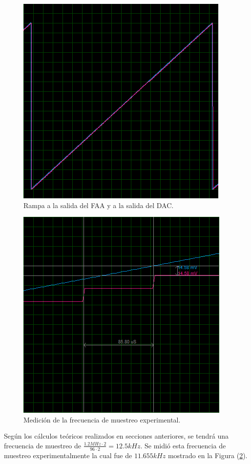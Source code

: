 \begin{figure}[H]
\centering
\includegraphics[width=0.8\linewidth]{ImagenesEjercicio1/rampa1.png}
\caption{Rampa a la salida del FAA y a la salida del DAC.}
\label{med1}
\end{figure}

\begin{figure}[H]
\centering
\includegraphics[width=0.8\linewidth]{ImagenesEjercicio1/rampa1zoom.png}
\caption{Medición de la frecuencia de muestreo experimental.}
\label{med2}
\end{figure}
Según los cálculos teóricos realizados en secciones anteriores, se tendrá una frecuencia de muestreo de $\frac{1.2MHz \cdot 2}{96 \cdot 2} = 12.5kHz$. Se midió esta frecuencia de muestreo experimentalmente la cual fue de $11.655kHz$ mostrado en la Figura (\ref{med2}).


